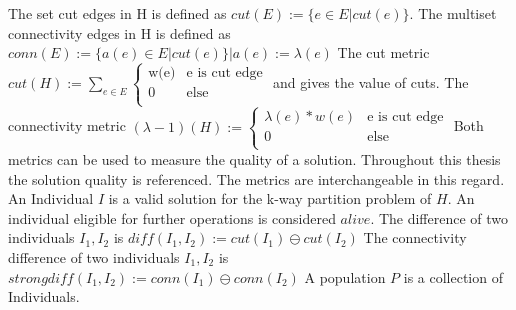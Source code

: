 \documentclass[a4paper,12pt,bibtotoc,titlepage, liststotoc,BCOR7mm,headsepline,pointlessnumbers]{scrbook}
\numberwithin{equation}{section}
\begin{document}
The set cut edges in H is defined as
$cut(E) := \{e \in E | cut(e) \}$.
The multiset connectivity edges in H is defined as
$conn(E) := \{a(e) \in E | cut(e) \} |a(e) := \lambda(e)$
The cut metric $cut(H) := \sum_{e \in E} 
\begin{cases}
       \text{w(e)} & \text{e is cut edge}\\
       \text{0} &\text{else}\\
     \end{cases}$  and gives the value of cuts.
The connectivity metric $(\lambda -1)(H) := \begin{cases}
       \text{$\lambda(e)*w(e)$} & \text{e is cut edge}\\
       \text{0} &\text{else}\\
     \end{cases}$
Both metrics can be used to measure the quality of a solution. Throughout this thesis the solution quality is referenced. The metrics are interchangeable in this regard.
An Individual $I$ is a valid solution for the k-way partition problem of $H$.
An individual eligible for further operations is considered $alive$.
The difference of two individuals $I_1, I_2$ is $diff(I_1, I_2) := cut(I_1) \ominus cut(I_2)$
The connectivity difference of two individuals $I_1, I_2$ is $strongdiff(I_1, I_2) := conn(I_1) \ominus conn(I_2)$
A population $P$ is a collection of Individuals.

\end{document}
